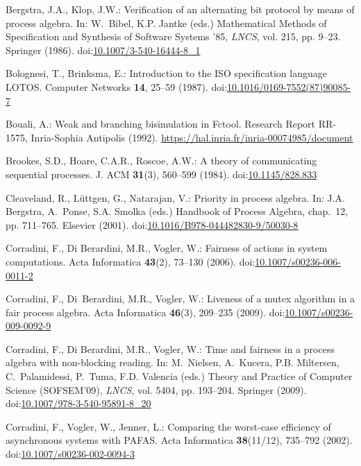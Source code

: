 \documentclass[smallcondensed]{svjour3}
\providecommand{\urlalt}[2]{\href{#1}{#2}}
\providecommand{\doi}[1]{doi:\urlalt{http://dx.doi.org/#1}{#1}}
\begin{document}
\begin{thebibliography}{10}
Bergstra, J.A., Klop, J.W.: Verification of an alternating bit protocol by
  means of process algebra.
\newblock In: W.~Bibel, K.P. Jantke (eds.) Mathematical Methods of
  Specification and Synthesis of Software Systems '85, \emph{\rm LNCS}, vol.
  215, pp. 9--23. Springer (1986).
\newblock \doi{10.1007/3-540-16444-8\_1}

Bolognesi, T., Brinksma, E.: Introduction to the {ISO} specification language
  {LOTOS}.
\newblock Computer Networks \textbf{14}, 25--59 (1987).
\newblock \doi{10.1016/0169-7552(87)90085-7}

Bouali, A.: Weak and branching bisimulation in {Fctool}.
\newblock Research Report RR-1575, Inria-Sophia Antipolis (1992).
\newblock \urlprefix\url{https://hal.inria.fr/inria-00074985/document}

Brookes, S.D., Hoare, C.A.R., Roscoe, A.W.: A theory of communicating
  sequential processes.
\newblock J. ACM \textbf{31}(3), 560--599 (1984).
\newblock \doi{10.1145/828.833}

Cleaveland, R., L{\"u}ttgen, G., Natarajan, V.: Priority in process algebra.
\newblock In: J.A. Bergstra, A.~Ponse, S.A. Smolka (eds.) Handbook of Process
  Algebra, chap.~12, pp. 711--765. Elsevier (2001).
\newblock \doi{10.1016/B978-044482830-9/50030-8}

Corradini, F., {Di Berardini}, M.R., Vogler, W.: Fairness of actions in system
  computations.
\newblock Acta Informatica \textbf{43}(2), 73--130 (2006).
\newblock \doi{10.1007/s00236-006-0011-2}

Corradini, F., Di~Berardini, M.R., Vogler, W.: Liveness of a mutex algorithm in
  a fair process algebra.
\newblock Acta Informatica \textbf{46}(3), 209--235 (2009).
\newblock \doi{10.1007/s00236-009-0092-9}

Corradini, F., {Di Berardini}, M.R., Vogler, W.: Time and fairness in a process
  algebra with non-blocking reading.
\newblock In: M.~Nielsen, A.~Kucera, P.B. Miltersen, C.~Palamidessi, P.~Tuma,
  F.D. Valencia (eds.) Theory and Practice of Computer Science ({SOFSEM}'09),
  \emph{\rm LNCS}, vol. 5404, pp. 193--204. Springer (2009).
\newblock \doi{10.1007/978-3-540-95891-8\_20}

Corradini, F., Vogler, W., Jenner, L.: Comparing the worst-case efficiency of
  asynchronous systems with {PAFAS}.
\newblock Acta Informatica \textbf{38}(11/12), 735--792 (2002).
\newblock \doi{10.1007/s00236-002-0094-3}


\end{thebibliography}
\end{document}
